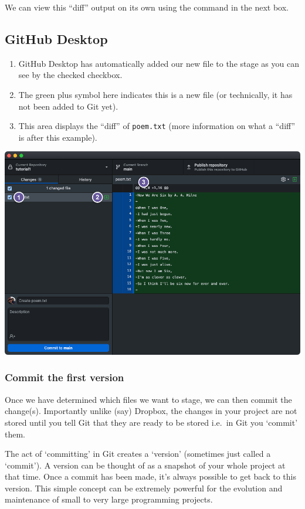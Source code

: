 \documentclass[
  letterpaper,
  DIV=11,
  numbers=noendperiod]{scrartcl}
\providecommand{\tightlist}{%
  \setlength{\itemsep}{0pt}\setlength{\parskip}{0pt}}\usepackage{longtable,booktabs,array}
\begin{document}
We can view this ``diff'' output on its own using the command in the
next box.

\subsection{GitHub Desktop}

\begin{enumerate}
\def\labelenumi{\arabic{enumi}.}
\tightlist
\item
  GitHub Desktop has automatically added our new file to the stage as
  you can see by the checked checkbox.
\item
  The green plus symbol here indicates this is a new file (or
  technically, it has not been added to Git yet).
\item
  This area displays the ``diff'' of \texttt{poem.txt} (more information
  on what a ``diff'' is after this example).
\end{enumerate}

\includegraphics{images/image10.png}

\subsubsection{Commit the first version}\label{commit-the-first-version}

Once we have determined which files we want to stage, we can then commit
the change(s). Importantly unlike (say) Dropbox, the changes in your
project are not stored until you tell Git that they are ready to be
stored i.e.~in Git you `commit' them.

The act of `committing' in Git creates a `version' (sometimes just
called a `commit'). A version can be thought of as a snapshot of your
whole project at that time. Once a commit has been made, it's always
possible to get back to this version. This simple concept can be
extremely powerful for the evolution and maintenance of small to very
large programming projects.
\end{document}
